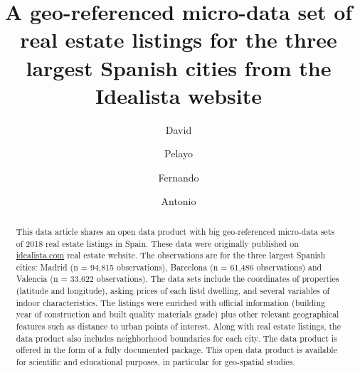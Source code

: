 \documentclass[times,final]{elsarticle}
\begin{document}

\begin{frontmatter}

\title{A geo-referenced micro-data set of real estate listings for the three largest Spanish cities from the Idealista website}%

\author[1]{David }
\author[1]{Pelayo }
\author[2]{Fernando }
\author[3]{Antonio }

\address[1]{idealista, Plaza de las Cortes 5, 28014 Madrid, Spain}
\address[2]{Facultad de CC de la Empresa, C/ Real, 3. 30201 Cartagena, Murcia (Spain)}
\address[3]{School of Earth, Environment and Society, McMaster University, 1280 Main St W, Hamilton, Ontario L8S 4K1 Canada}


\begin{abstract}
This data article shares an open data product with big geo-referenced micro-data sets of 2018 real estate listings in Spain. These data were originally published on \url{idealista.com} real estate website. The observations are for the three largest Spanish cities: Madrid (n = 94,815 observations), Barcelona (n = 61,486 observations) and Valencia (n = 33,622 observations). The data sets include the coordinates of properties (latitude and longitude), asking prices of each listd dwelling, and several variables of indoor characteristics. The listings were enriched with official information (building year of construction and built quality materials grade) plus other relevant geographical features such as distance to urban points of interest. Along with real estate listings, the data product also includes neighborhood boundaries for each city. The data product is offered in the form of a fully documented  package. This open data product is available for scientific and educational purposes, in particular for geo-spatial studies.
\end{abstract}


\end{frontmatter}
\end{document}
